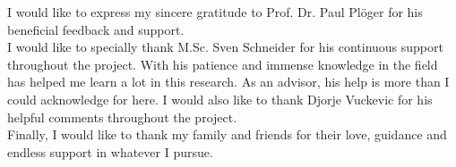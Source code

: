 \documentclass[rnd]{mas_report}
\begin{document}
\begin{acknowledgements}
I would like to express my sincere gratitude to Prof. Dr. Paul Pl{\"o}ger for his beneficial feedback and support.\\

I would like to specially thank M.Sc. Sven Schneider for his continuous support throughout the project. With his patience and immense knowledge in the field has helped me learn a lot in this research. As an advisor, his help is more than I could acknowledge for here. I would also like to thank Djorje Vuckevic for his helpful comments throughout the project.\\


Finally, I would like to thank my family and friends for their love, guidance and endless support in whatever I pursue.
\end{acknowledgements}


\tableofcontents
\listoffigures
\listoftables
\end{document}

